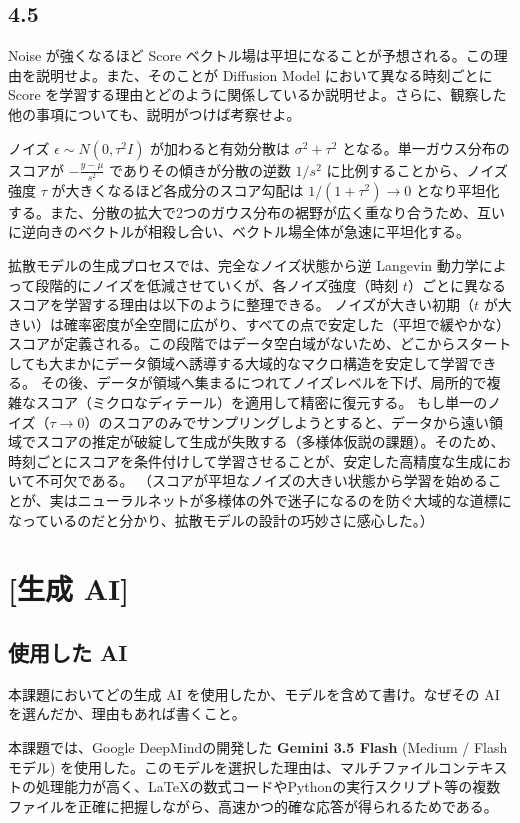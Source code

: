 \documentclass[11pt,a4paper,dvipdfmx]{article}
\numberwithin{equation}{section}
\newenvironment{proofbox}[0]
{
    \begin{mdframed}[
        linecolor=black,
        topline=false,
        bottomline=false,
        rightline=false,
        leftline=true,
        linewidth=2pt,
        innerleftmargin=10pt,
        skipabove=\baselineskip,
        skipbelow=\baselineskip,
    ]
}
{
    \end{mdframed}
}
\newenvironment{note}[0]
{
    \begin{tcolorbox}[sharp corners, colframe=gray!20, colback=gray!20, width=\textwidth]
}
{
    \end{tcolorbox}
}
\begin{document}
\subsection*{4.5}
\begin{note}
Noise が強くなるほど Score ベクトル場は平坦になることが予想される。この理由を説明せよ。また、そのことが Diffusion Model において異なる時刻ごとに Score を学習する理由とどのように関係しているか説明せよ。さらに、観察した他の事項についても、説明がつけば考察せよ。
\end{note}
\begin{proofbox}
ノイズ $\epsilon \sim N(0, \tau^2 I)$ が加わると有効分散は $\sigma^2 + \tau^2$ となる。単一ガウス分布のスコアが $-\frac{y-\mu}{s^2}$ でありその傾きが分散の逆数 $1/s^2$ に比例することから、ノイズ強度 $\tau$ が大きくなるほど各成分のスコア勾配は $1/(1+\tau^2) \to 0$ となり平坦化する。また、分散の拡大で2つのガウス分布の裾野が広く重なり合うため、互いに逆向きのベクトルが相殺し合い、ベクトル場全体が急速に平坦化する。

拡散モデルの生成プロセスでは、完全なノイズ状態から逆 Langevin 動力学によって段階的にノイズを低減させていくが、各ノイズ強度（時刻 $t$）ごとに異なるスコアを学習する理由は以下のように整理できる。
ノイズが大きい初期（$t$ が大きい）は確率密度が全空間に広がり、すべての点で安定した（平坦で緩やかな）スコアが定義される。この段階ではデータ空白域がないため、どこからスタートしても大まかにデータ領域へ誘導する大域的なマクロ構造を安定して学習できる。
その後、データが領域へ集まるにつれてノイズレベルを下げ、局所的で複雑なスコア（ミクロなディテール）を適用して精密に復元する。
もし単一のノイズ（$\tau \to 0$）のスコアのみでサンプリングしようとすると、データから遠い領域でスコアの推定が破綻して生成が失敗する（多様体仮説の課題）。そのため、時刻ごとにスコアを条件付けして学習させることが、安定した高精度な生成において不可欠である。
（スコアが平坦なノイズの大きい状態から学習を始めることが、実はニューラルネットが多様体の外で迷子になるのを防ぐ大域的な道標になっているのだと分かり、拡散モデルの設計の巧妙さに感心した。）
\end{proofbox}


\section*{[生成 AI]}

\subsection*{使用した AI}
\begin{note}
本課題においてどの生成 AI を使用したか、モデルを含めて書け。なぜその AI を選んだか、理由もあれば書くこと。
\end{note}
\begin{proofbox}
本課題では、Google DeepMindの開発した \textbf{Gemini 3.5 Flash} (Medium / Flashモデル) を使用した。このモデルを選択した理由は、マルチファイルコンテキストの処理能力が高く、LaTeXの数式コードやPythonの実行スクリプト等の複数ファイルを正確に把握しながら、高速かつ的確な応答が得られるためである。
\end{proofbox}
\end{document}
